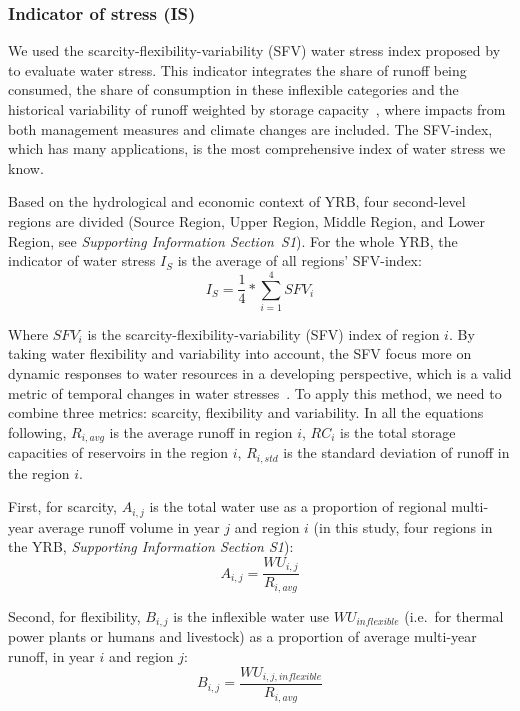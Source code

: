 \documentclass[draft]{../agujournal2019}
\begin{document}
	\subsubsection{Indicator of stress (IS)}
	We used the scarcity-flexibility-variability (SFV) water stress index proposed by  to evaluate water stress.
	This indicator integrates the share of runoff being consumed, the share of consumption in these inflexible categories and the historical variability of runoff weighted by storage capacity~\cite{qin2019}, where impacts from both management measures and climate changes are included.
The SFV-index, which has many applications, is the most comprehensive index of water stress we know.

	Based on the hydrological and economic context of YRB, four second-level regions are divided (Source Region, Upper Region, Middle Region, and Lower Region, see \textit{Supporting Information Section~S1}).
	For the whole YRB, the indicator of water stress $I_S$ is the average of all regions' SFV-index:
	\begin{equation}
		I_S = \frac{1}{4} * \sum_{i=1}^4 SFV_{i}
	\end{equation}

	Where $SFV_i$ is the scarcity-flexibility-variability (SFV) index of region $i$. By taking water flexibility and variability into account, the SFV focus more on dynamic responses to water resources in a developing perspective, which is a valid metric of temporal changes in water stresses~\cite{qin2019}. To apply this method, we need to combine three metrics: scarcity, flexibility and variability.
	In all the equations following, $R_{i, avg}$ is the average runoff in region $i$, $RC_i$ is the total storage capacities of reservoirs in the region $i$, $R_{i, std}$ is the standard deviation of runoff in the region $i$.

	First, for scarcity, $A_{i, j}$ is the total water use as a proportion of regional multi-year average runoff volume in year $j$ and region $i$ (in this study, four regions in the YRB, \textit{Supporting Information Section S1}):
	\begin{equation}
		A_{i, j} = \frac{WU_{i,j}}{R_{i, avg}}
	\end{equation}

	Second, for flexibility, $B_{i, j}$ is the inflexible water use $WU_{inflexible}$ (i.e.\ for thermal power plants or humans and livestock) as a proportion of average multi-year runoff, in year $i$ and region $j$:
	\begin{equation}
		B_{i, j} = \frac{WU_{i, j, inflexible}}{R_{i, avg}}
	\end{equation}
\end{document}
